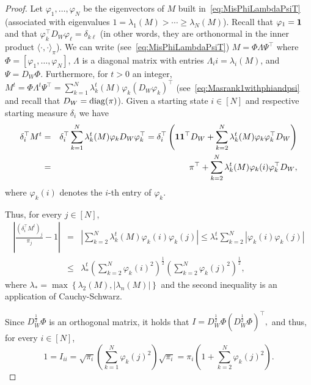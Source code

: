 \begin{proof}
Let $\varphi_1,\dots,\varphi_N$ be the eigenvectors of $M$ built in~\eqref{eq:MisPhiLambdaPsiT} (associated with eigenvalues $1=\lambda_1(M)>\cdots\geq\lambda_N(M)$). Recall that $\varphi_1=\mathbf{1}$ and that $\varphi_k^\top D_W\varphi_\ell=\delta_{k\ell}$ (in other words, they are orthonormal in the inner product $\langle\cdot,\cdot\rangle_\pi$). We can write (see~\eqref{eq:MisPhiLambdaPsiT}) $M = \Phi\Lambda\Psi^\top$ where $\Phi=[\varphi_1,\dots,\varphi_N]$, $\Lambda$ is a diagonal matrix with entries $\Lambda_ii= \lambda_i(M)$, and $\Psi = D_W\Phi$. Furthermore, for $t>0$ an integer, $M^t = \Phi\Lambda^t\Psi^\top=\sum_{k=1}^N\lambda_k^t(M)\varphi_k (D_W\varphi_k)^\top$ (see~\eqref{eq:Masrank1withphiandpsi} and recall that $D_W=\operatorname{diag}(\pi)$). 
Given a starting state $i\in[N]$ and respective starting measure $\delta_i$ we have
\begin{eqnarray*}
\delta_i^\top M^t &=& \delta_i^\top\sum_{k=1}^N\lambda_k^t(M)\varphi_k D_W\varphi_k^\top =  \delta_i^\top\left( \mathbf{1}\mathbf{1}^\top D_W + \sum_{k=2}^N\lambda_k^t(M)\varphi_k \varphi_k^\top D_W\right) \\
    &=& \pi^\top + \sum_{k=2}^N\lambda_k^t(M)\varphi_k(i) \varphi_k^\top D_W,
\end{eqnarray*}
where $\varphi_k(i)$ denotes the $i$-th entry of $\varphi_k$.

Thus, for every $j\in[N]$,
\begin{eqnarray}
    \left| \frac{\left(\delta_i^\top M^t\right)_j}{\pi_j} - 1 \right| & = & \left| \sum_{k=2}^N\lambda_k^t(M)\varphi_k(i) \varphi_k(j) \right| \leq \lambda_\ast^t   \sum_{k=2}^N\left|\varphi_k(i) \varphi_k(j) \right| \nonumber\\
    &\leq & \lambda_\ast^t \left( \sum_{k=2}^N  \varphi_k(i)^2\right)^{\frac12}
    \left( \sum_{k=2}^N  \varphi_k(j)^2\right)^{\frac12}, \label{eq:MCequation2}
\end{eqnarray}
where $\lambda_\ast = \max\left\{\lambda_2(M),|\lambda_n(M)|\right\}$ and the second inequality is an application of Cauchy-Schwarz.

Since $D_W^{\frac12}\Phi$ is an orthogonal matrix, it holds that
\(
I = D_W^{\frac12}\Phi\left(D_W^{\frac12}\Phi \right)^\top, 
\)
and thus, for every $i\in[N]$,
\begin{equation}\label{eq:MCequation3}
1 = I_{ii} = \sqrt{\pi_i} \left( \sum_{k=1}^N  \varphi_k(j)^2\right) \sqrt{\pi_i} = \pi_i \left( 1 + \sum_{k=2}^N  \varphi_k(j)^2 \right).
\end{equation}


\end{proof}
